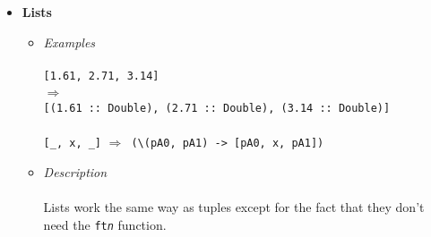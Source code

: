 \documentclass[diploma]{softlab-thesis}
\def\lra{$\Longrightarrow$\ }
\def\pend{\mbox{}\\\\}
\begin{document}
\begin{itemize}
\begin{itemize}
\paragraph{Parameters for the underscores}\pend
For all the fields of the tuple that contain an underscore, we generate a new
parameter in its place \\("\texttt{pA\textit{<n - 1>}}" for
the n-th underscore) and at the end we prepend the parameters to make it a
function expression. "pA" stands for parameter and the A is uppercase to avoid
collisions with regular lcases identifiers.

\paragraph{Big Tuples}\pend
For big tuples, the original lines are kept and split in the same way.
The \texttt{ft\textit{n}} function and the implicitly introduced parameters
have their own separate lines at the top as shown in the following example:
\begin{verbatim}
( "Hey, I'm the first field and I'm also a pretty big string."
, "Hey, I'm the second field and I'm a smaller string."
, _
)
\end{verbatim}
Becomes:
\begin{verbatim}
\pA0 ->
ft3
( "Hey, I'm the first field and I'm also a pretty big string."
, "Hey, I'm the second field and I'm a smaller string"
, pA0
)
\end{verbatim}
All of these lines are also indented to the same column according to the
indentation level.

\end{itemize}

\item
\textbf{Lists}

\begin{itemize}
\item
\textit{Examples}\\\\
\texttt{[1.61, 2.71, 3.14]}
\\ \lra \\
\verb|[(1.61 :: Double), (2.71 :: Double), (3.14 :: Double)]| \\\\
\verb|[_, x, _]| \lra \verb|(\(pA0, pA1) -> [pA0, x, pA1])| \\

\item
\textit{Description}\\\\
Lists work the same way as tuples except for the fact that they don't need
the \texttt{ft\textit{n}} function.

\end{itemize}

\end{itemize}
\end{document}
